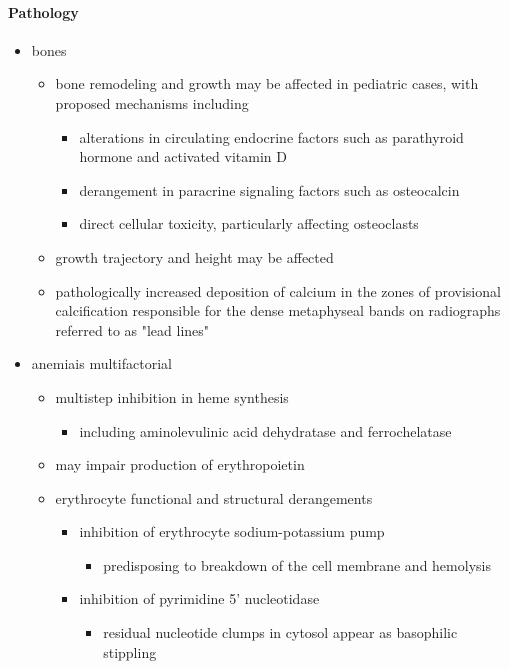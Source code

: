 \paragraph{Pathology}

\begin{itemize}
	\item
	bones
	
	\begin{itemize}
		\item
		bone remodeling and growth may be affected in pediatric cases, with proposed mechanisms including 
		
		\begin{itemize}
			\item
			alterations in circulating endocrine factors such as parathyroid hormone and activated vitamin D
			\item
			derangement in paracrine signaling factors such as osteocalcin
			\item
			direct cellular toxicity, particularly affecting osteoclasts
		\end{itemize}
		\item
		growth trajectory and height may be affected
		\item
		pathologically increased deposition of calcium in the zones of provisional calcification responsible for the dense metaphyseal bands on radiographs referred to as "lead lines"
	\end{itemize}
	\item
	anemiais multifactorial
	
	\begin{itemize}
		\item
		\hspace{0pt}multistep inhibition in heme synthesis
		
		\begin{itemize}
			\item
			including aminolevulinic acid dehydratase and ferrochelatase 
		\end{itemize}
		\item
		may impair production of erythropoietin 
		\item
		erythrocyte functional and structural derangements
		
		\begin{itemize}
			\item
			inhibition of erythrocyte sodium-potassium pump 
			
			\begin{itemize}
				\item
				predisposing to breakdown of the cell membrane and hemolysis
			\end{itemize}
			\item
			inhibition of pyrimidine 5' nucleotidase
			
			\begin{itemize}
				\item
				residual nucleotide clumps in cytosol appear as basophilic stippling
			\end{itemize}
		\end{itemize}
	\end{itemize}
\end{itemize}


